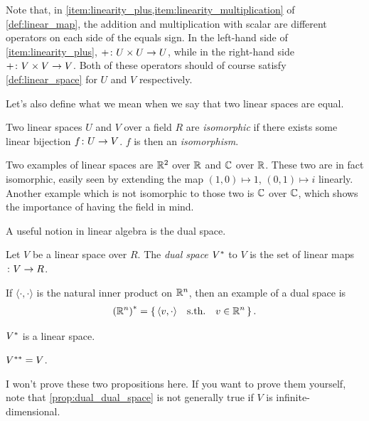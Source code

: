 \documentclass[english, 12pt]{article}
\begin{document}
Note that, in \cref{item:linearity_plus,item:linearity_multiplication} of \cref{def:linear_map}, the addition and multiplication with scalar are different operators on each side of the equals sign.
In the left-hand side of \cref{item:linearity_plus}, \(+ \colon U \times U \to U\), while in the right-hand side \(+ \colon V \times V \to V\).
Both of these operators should of course satisfy \cref{def:linear_space} for \(U\) and \(V\) respectively.

Let's also define what we mean when we say that two linear spaces are equal.
\begin{definition}
	Two linear spaces \(U\) and \(V\) over a field \(R\) are \emph{isomorphic} if there exists some linear bijection \(f \colon U \to V\).
	\(f\) is then an \emph{isomorphism}.
\end{definition}

Two examples of linear spaces are \(\mathbb{R}^2\) over \(\mathbb{R}\) and \(\mathbb{C}\) over \(\mathbb{R}\).
These two are in fact isomorphic, easily seen by extending the map \((1, 0) \mapsto 1\), \((0, 1) \mapsto i\) linearly.
Another example which is not isomorphic to those two is \(\mathbb{C}\) over \(\mathbb{C}\), which shows the importance of having the field in mind.

A useful notion in linear algebra is the dual space.
\begin{definition}\label{def:dual_space}
	Let \(V\) be a linear space over \(R\).
	The \emph{dual space} \({V}^{\ast}\) to \(V\) is the set of linear maps \(\colon V \to R\).
\end{definition}

If \(\langle \cdot, \cdot \rangle\) is the natural inner product on \(\mathbb{R}^n\), then an example of a dual space is
\begin{align*}
	{(\mathbb{R}^n)}^{\ast} = \set{ \langle v, \cdot \rangle \quad \textrm{s.th.} \quad v \in \mathbb{R}^n}.
\end{align*}

\begin{proposition}
	${V}^{\ast}$ is a linear space.
\end{proposition}

\begin{proposition}\label{prop:dual_dual_space}
	\({V}^{\ast\ast} = V\).
\end{proposition}

I won't prove these two propositions here.
If you want to prove them yourself, note that \cref{prop:dual_dual_space} is not generally true if $V$ is infinite-dimensional.
\end{document}

